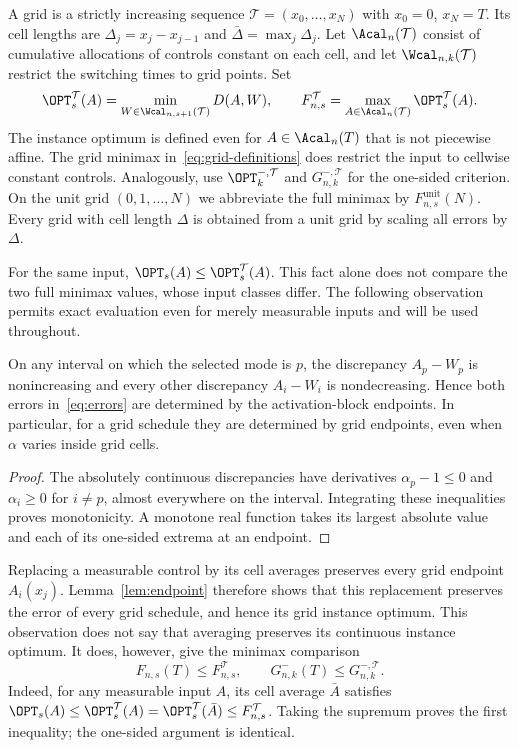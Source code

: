 A grid is a strictly increasing sequence
$\mathcal T=(x_0,\ldots,x_N)$ with $x_0=0$, $x_N=T$. Its cell lengths are
$\Delta_j=x_j-x_{j-1}$ and $\bar\Delta=\max_j\Delta_j$.
Let $\Acal_n(\mathcal T)$ consist of cumulative allocations of controls
constant on each cell, and let $\Wcal_{n,k}(\mathcal T)$ restrict the switching
times to grid points. Set
\begin{equation}\label{eq:grid-definitions}
 \OPT_s^{\mathcal T}(A)=
 \min_{W\in\Wcal_{n,s+1}(\mathcal T)}D(A,W),\qquad
 F^{\mathcal T}_{n,s}=
 \max_{A\in\Acal_n(\mathcal T)}\OPT_s^{\mathcal T}(A).
\end{equation}
The instance optimum is defined even for $A\in\Acal_n(T)$ that is not
piecewise affine. The grid minimax in~\eqref{eq:grid-definitions} does restrict
the input to cellwise constant controls. Analogously, use
$\OPT_k^{-,\mathcal T}$ and $G_{n,k}^{-,\mathcal T}$ for the one-sided
criterion. On the unit grid $(0,1,\ldots,N)$ we abbreviate the full minimax by
$F^{\mathrm{unit}}_{n,s}(N)$. Every grid with cell length $\Delta$ is obtained
from a unit grid by scaling all errors by $\Delta$.

For the same input, $\OPT_s(A)\le\OPT_s^{\mathcal T}(A)$. This fact alone
does not compare the two full minimax values, whose input classes differ.
The following observation permits exact evaluation even for merely measurable
inputs and will be used throughout.

\begin{lemma}\label{lem:endpoint}
On any interval on which the selected mode is $p$, the discrepancy
$A_p-W_p$ is nonincreasing and every other discrepancy $A_i-W_i$ is
nondecreasing. Hence both errors in~\eqref{eq:errors} are determined by the
activation-block endpoints. In particular, for a grid schedule they are
determined by grid endpoints, even when $\alpha$ varies inside grid cells.
\end{lemma}
\begin{proof}
The absolutely continuous discrepancies have derivatives $\alpha_p-1\le0$
and $\alpha_i\ge0$ for $i\ne p$, almost everywhere on the interval. Integrating
these inequalities proves monotonicity. A monotone real function takes its
largest absolute value and each of its one-sided extrema at an endpoint.
\end{proof}

Replacing a measurable control by its cell averages preserves every grid
endpoint $A_i(x_j)$. Lemma~\ref{lem:endpoint} therefore shows that this
replacement preserves the error of every grid schedule, and hence its grid
instance optimum. This observation does not say that averaging preserves
its continuous instance optimum. It does, however, give the minimax comparison
\begin{equation}\label{eq:minimax-grid-domination}
 F_{n,s}(T)\le F^{\mathcal T}_{n,s},\qquad
 G^-_{n,k}(T)\le G^{-,\mathcal T}_{n,k}.
\end{equation}
Indeed, for any measurable input $A$, its cell average $\bar A$ satisfies
$\OPT_s(A)\le\OPT_s^{\mathcal T}(A)=
\OPT_s^{\mathcal T}(\bar A)\le F^{\mathcal T}_{n,s}$.
Taking the supremum proves the first inequality; the one-sided argument is
identical.

